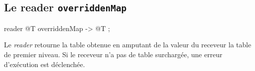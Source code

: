 \subsection{Le reader \texttt{overriddenMap}}

\begin{galgascode}
reader @T overriddenMap -> @T ;
\end{galgascode}


Le \emph{reader}  retourne la table obtenue en amputant de la valeur du receveur la table de premier niveau. Si le receveur n'a pas de table surchargée, une erreur d'exécution est déclenchée.



%
%
%
%
%
%
%
%
%
%
%
%
%
%
